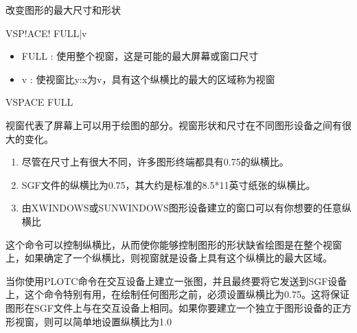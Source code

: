 \label{cmd:vspace}

改变图形的最大尺寸和形状

\begin{SACSTX}
VSP!ACE! FULL|v
\end{SACSTX}

\begin{itemize}
\item FULL : 使用整个视窗，这是可能的最大屏幕或窗口尺寸 
\item v : 使视窗比y:x为v，具有这个纵横比的最大的区域称为视窗 
\end{itemize}

\begin{SACDFT}
VSPACE FULL
\end{SACDFT}

视窗代表了屏幕上可以用于绘图的部分。视窗形状和尺寸在不同图形设备之间有很大的变化。
\begin{enumerate}
\item 尽管在尺寸上有很大不同，许多图形终端都具有0.75的纵横比。
\item SGF文件的纵横比为0.75，其大约是标准的8.5*11英寸纸张的纵横比。
\item  由XWINDOWS或SUNWINDOWS图形设备建立的窗口可以有你想要的任意纵横比
\end{enumerate}

这个命令可以控制纵横比，从而使你能够控制图形的形状缺省绘图是在整个视窗上，如果确定了一个纵横比，则视窗就是设备上具有这个纵横比的最大区域。

当你使用PLOTC命令在交互设备上建立一张图，并且最终要将它发送到SGF设备上，这个命令特别有用，在绘制任何图形之前，必须设置纵横比为0.75。这将保证图形在SGF文件上与在交互设备上相同。如果你要建立一个独立于图形设备的正方形视窗，则可以简单地设置纵横比为1.0
